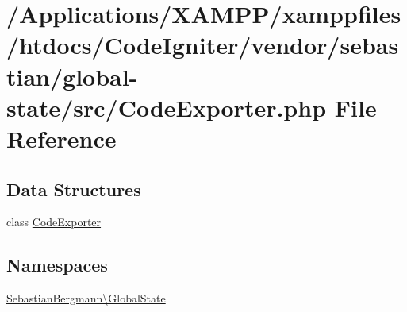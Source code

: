 \hypertarget{_code_exporter_8php}{}\section{/\+Applications/\+X\+A\+M\+P\+P/xamppfiles/htdocs/\+Code\+Igniter/vendor/sebastian/global-\/state/src/\+Code\+Exporter.php File Reference}
\label{_code_exporter_8php}
\subsection*{Data Structures}
\begin{DoxyCompactItemize}
\item 
class \mbox{\hyperlink{class_sebastian_bergmann_1_1_global_state_1_1_code_exporter}{Code\+Exporter}}
\end{DoxyCompactItemize}
\subsection*{Namespaces}
\begin{DoxyCompactItemize}
\item 
 \mbox{\hyperlink{namespace_sebastian_bergmann_1_1_global_state}{Sebastian\+Bergmann\textbackslash{}\+Global\+State}}
\end{DoxyCompactItemize}
